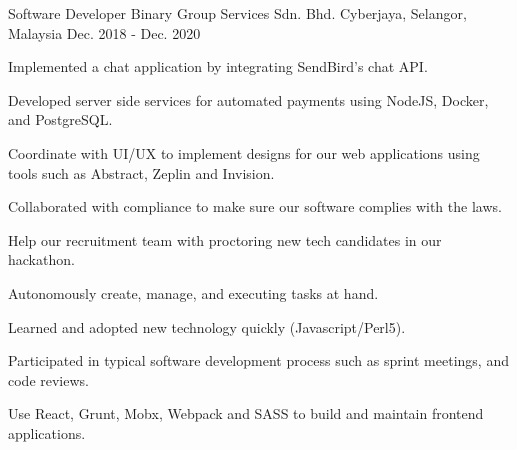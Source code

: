 \begin{cventries}
  \cventry
    {Software Developer} %
    {Binary Group Services Sdn. Bhd.} %
    {Cyberjaya, Selangor, Malaysia} %
    {Dec. 2018 - Dec. 2020} %
    {
      \begin{cvitems} %
        \item {Implemented a chat application by integrating SendBird's chat API.}
        \item {Developed server side services for automated payments using NodeJS, Docker, and PostgreSQL.}
        \item {Coordinate with UI/UX to implement designs for our web applications using tools such as Abstract, Zeplin and Invision.}
        \item {Collaborated with compliance to make sure our software complies with the laws.}
        \item {Help our recruitment team with proctoring new tech candidates in our hackathon.}
        \item {Autonomously create, manage, and executing tasks at hand.}
        \item {Learned and adopted new technology quickly (Javascript/Perl5).}
        \item {Participated in typical software development process such as sprint meetings, and code reviews.}
        \item {Use React, Grunt, Mobx, Webpack and SASS to build and maintain frontend applications.}
      \end{cvitems}
    }

\end{cventries}
